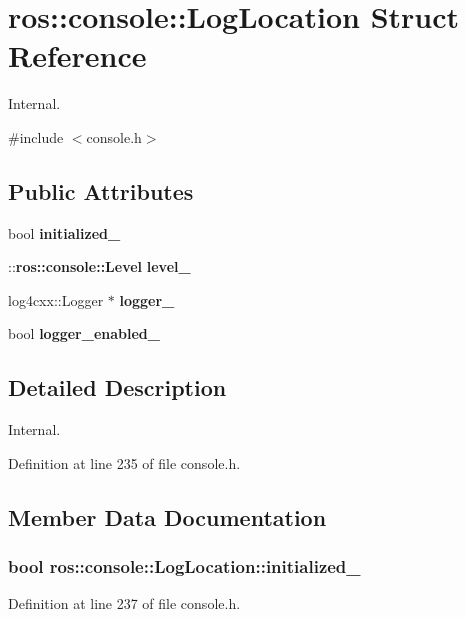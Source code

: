 \section{ros::console::LogLocation Struct Reference}
\label{structros_1_1console_1_1LogLocation}


Internal.  




{\ttfamily \#include $<$console.h$>$}

\subsection*{Public Attributes}
\begin{DoxyCompactItemize}
\item 
bool {\bf initialized\_\-}
\item 
::{\bf ros::console::Level} {\bf level\_\-}
\item 
log4cxx::Logger $\ast$ {\bf logger\_\-}
\item 
bool {\bf logger\_\-enabled\_\-}
\end{DoxyCompactItemize}


\subsection{Detailed Description}
Internal. 

Definition at line 235 of file console.h.



\subsection{Member Data Documentation}
\subsubsection[{initialized\_\-}]{\setlength{\rightskip}{0pt plus 5cm}bool {\bf ros::console::LogLocation::initialized\_\-}}\label{structros_1_1console_1_1LogLocation_a5302edfc483fe8e1265668f17f89b53b}


Definition at line 237 of file console.h.

